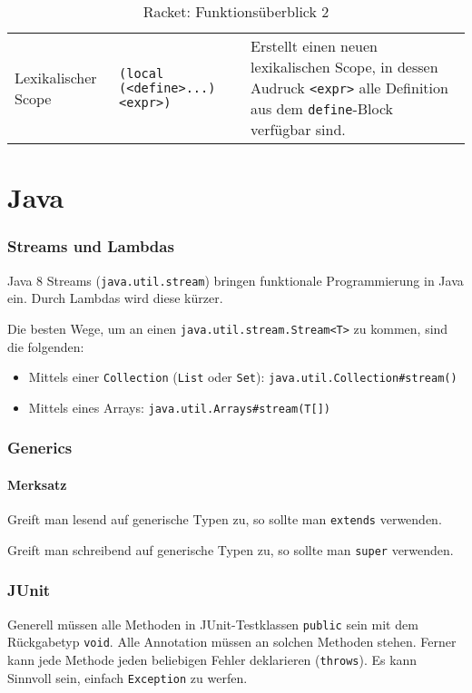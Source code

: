 \begin{sidewaystable}
\begin{tabular}{p{5cm} | p{7cm} | p{9cm}}
					Lexikalischer Scope                                               & \texttt{(local (<define>...) <expr>)}                                                                          & Erstellt einen neuen lexikalischen Scope, in dessen Audruck \texttt{<expr>} alle Definition aus dem \texttt{define}-Block verfügbar sind.                     \\
				\end{tabular}
				\caption{Racket: Funktionsüberblick 2}
			\end{sidewaystable}




\chapter{Java}
	\subsection{Streams und Lambdas}
		Java 8 Streams (\texttt{java.util.stream}) bringen funktionale Programmierung in Java ein. Durch Lambdas wird diese kürzer.

		Die besten Wege, um an einen \texttt{java.util.stream.Stream<T>} zu kommen, sind die folgenden:
		\begin{itemize}
			\item Mittels einer \texttt{Collection} (\texttt{List} oder \texttt{Set}): \texttt{java.util.Collection\#stream()}
			\item Mittels eines Arrays: \texttt{java.util.Arrays\#stream(T[])}
		\end{itemize}



	\subsection{Generics}
		\subsubsection{Merksatz}
			Greift man lesend auf generische Typen zu, so sollte man \texttt{extends} verwenden.

			\noindent Greift man schreibend auf generische Typen zu, so sollte man \texttt{super} verwenden.



	\subsection{JUnit}
		Generell müssen alle Methoden in JUnit-Testklassen \texttt{public} sein mit dem Rückgabetyp \texttt{void}. Alle Annotation müssen an solchen Methoden stehen. Ferner kann jede Methode jeden beliebigen Fehler deklarieren (\texttt{throws}). Es kann Sinnvoll sein, einfach \texttt{Exception} zu werfen.

